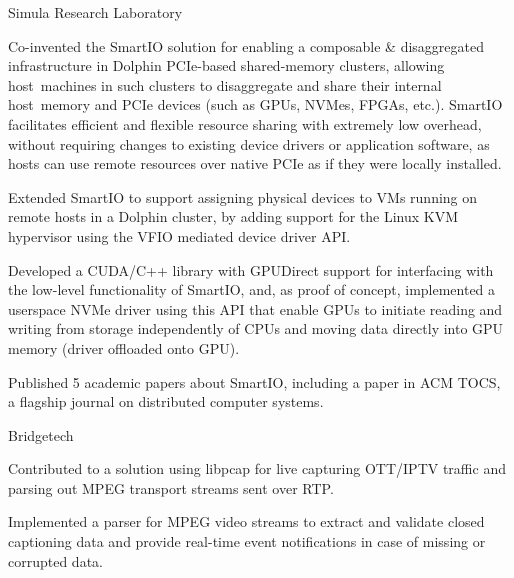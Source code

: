 \begin{experience}{Simula Research Laboratory}{
}
    \item{Co-invented the SmartIO solution for enabling a composable \& disaggregated infrastructure in Dolphin PCIe-based shared-memory clusters, allowing host~machines in such clusters to disaggregate and share their internal host~memory and PCIe devices (such as GPUs, NVMes, FPGAs, etc.). %
        SmartIO facilitates efficient and flexible resource sharing with extremely low overhead, without requiring changes to existing device drivers or application software, as hosts can use remote resources over native PCIe as if they were locally installed.}
    \item{Extended SmartIO to support assigning physical devices to VMs running on remote hosts in a Dolphin cluster, by adding support for the Linux KVM hypervisor using the VFIO mediated device driver API.}
    \item{Developed a CUDA/C++ library with GPUDirect support for interfacing with the low-level functionality of SmartIO, and, as proof of concept, implemented a userspace NVMe driver using this API that enable GPUs to initiate reading and writing from storage independently of CPUs and moving data directly into GPU memory (driver offloaded onto GPU).}
    \item{Published 5 academic papers about SmartIO, including a paper in ACM TOCS, a flagship journal on distributed computer systems.}
\end{experience}

\begin{experience}{Bridgetech}{}
    \item{Contributed to a solution using libpcap for live capturing OTT/IPTV traffic and parsing out MPEG transport streams sent over RTP.}
    \item{Implemented a parser for MPEG video streams to extract and validate closed captioning data and provide real-time event notifications in case of missing or corrupted data.}
\end{experience}



